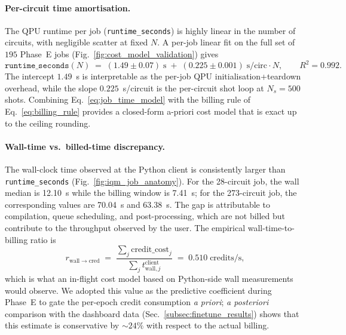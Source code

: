 \paragraph{Per-circuit time amortisation.}
The QPU runtime per job (\texttt{runtime\_seconds}) is highly linear in the number of circuits, with negligible scatter at fixed $N$. A per-job linear fit on the full set of $195$ Phase~E jobs (Fig.~\ref{fig:cost_model_validation}) gives
\begin{equation}
\texttt{runtime\_seconds}(N) \;=\; (1.49 \pm 0.07)\;\text{s} \;+\; (0.225 \pm 0.001)\;\text{s/circ} \cdot N,
\qquad R^2 = 0.992 .
\label{eq:job_time_model}
\end{equation}
The intercept $1.49$~s is interpretable as the per-job QPU initialisation+teardown overhead, while the slope $0.225$~s/circuit is the per-circuit shot loop at $N_s=500$ shots. Combining Eq.~\ref{eq:job_time_model} with the billing rule of Eq.~\ref{eq:billing_rule} provides a closed-form a-priori cost model that is exact up to the ceiling rounding.

\paragraph{Wall-time vs.\ billed-time discrepancy.}
The wall-clock time observed at the Python client is consistently larger than \texttt{runtime\_seconds} (Fig.~\ref{fig:iqm_job_anatomy}). For the 28-circuit job, the wall median is 12.10~s while the billing window is 7.41~s; for the 273-circuit job, the corresponding values are 70.04~s and 63.38~s. The gap is attributable to compilation, queue scheduling, and post-processing, which are not billed but contribute to the throughput observed by the user. The empirical wall-time-to-billing ratio is
\begin{equation}
r_{\mathrm{wall}\to\mathrm{cred}}
\;=\; \frac{\sum_{j} \text{credit\_cost}_j}{\sum_{j} t_{\mathrm{wall},j}^{\text{client}}}
\;=\; 0.510\;\text{credits/s},
\label{eq:wall_rate}
\end{equation}
which is what an in-flight cost model based on Python-side wall measurements would observe. We adopted this value as the predictive coefficient during Phase~E to gate the per-epoch credit consumption \emph{a priori}; \emph{a posteriori} comparison with the dashboard data (Sec.~\ref{subsec:finetune_results}) shows that this estimate is conservative by $\sim 24\%$ with respect to the actual billing.


